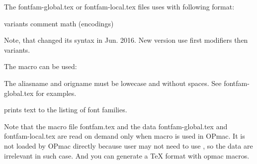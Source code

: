 The fontfam-global.tex or fontfam-local.tex files uses \setfontfam with
following format:

 {variants} {comment} {math} (encodings) {}

Note, that \setfontfam changed its syntax in Jun. 2016. New version use
first {modifiers} then {variants}.

The \famalias macro can be used:


The aliasname and origname must be lowecase and without spaces. See
fontfam-global.tex for examples.

 prints text to the listing of font families.

Note that the macro file fontfam.tex and the data fontfam-global.tex and
fontfam-local.tex are read on demand only when \fontfam macro is used in
OPmac. It is not loaded by OPmac directly because user may not need to use
\fontfam, so the data are irrelevant in such case. And you can generate
a TeX format with opmac macros.  
